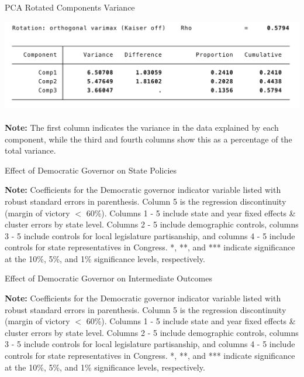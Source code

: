 \documentclass{article}
\begin{document}
\begin{table}[!hbtp]
\caption{PCA Rotated Components Variance}
\includegraphics[width=15cm]{output/tables/pca_rotated_comp}
\\ \\
\textbf{Note:} The first column indicates the variance in the data explained by each component, while the third and fourth columns show this as a percentage of the total variance.
\label{table:pca_rotated_comp}
\end{table}



\begin{table}[!hbtp]
\caption{Effect of Democratic Governor on State Policies}

\textbf{Note:} Coefficients for the Democratic governor indicator variable listed with robust standard errors in parenthesis. Column 5 is the regression discontinuity (margin of victory $<$ 60\%). Columns 1 - 5 include state and year fixed effects \& cluster errors by state level. Columns 2 - 5 include demographic controls, columns 3 - 5 include controls for local legislature partisanship, and columns 4 - 5 include controls for state representatives in Congress. *, **, and *** indicate significance at the 10\%, 5\%, and 1\% significance levels, respectively.
\label{table:policies_a}
\end{table}

\begin{table}[!hbtp]
\caption{Effect of Democratic Governor on Intermediate Outcomes}

\textbf{Note:} Coefficients for the Democratic governor indicator variable listed with robust standard errors in parenthesis. Column 5 is the regression discontinuity (margin of victory $<$ 60\%). Columns 1 - 5 include state and year fixed effects \& cluster errors by state level. Columns 2 - 5 include demographic controls, columns 3 - 5 include controls for local legislature partisanship, and columns 4 - 5 include controls for state representatives in Congress. *, **, and *** indicate significance at the 10\%, 5\%, and 1\% significance levels, respectively.
\label{table:outcome_a}
\end{table}
\end{document}
